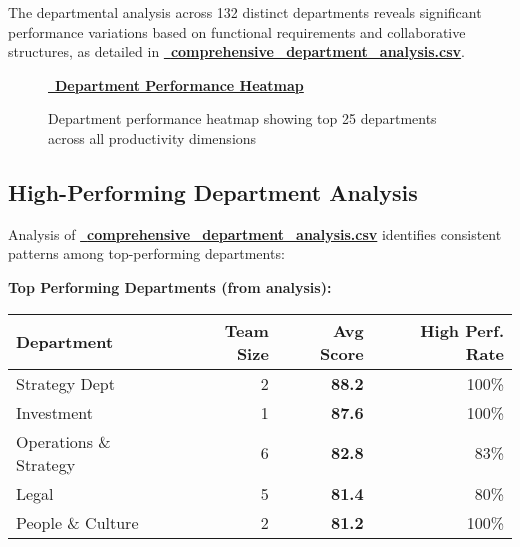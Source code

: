 \documentclass[12pt,a4paper]{article}
\newcommand{\styledimagelink}[2]{\textcolor{accentBlue}{\href{#1}{{\normalsize\faImage}\, \textbf{#2}}}}
\begin{document}
The departmental analysis across 132 distinct departments reveals significant performance variations based on functional requirements and collaborative structures, as detailed in \textcolor{primaryBlue}{\href{https://fixysaskihumorizijuv.supabase.co/storage/v1/object/public/research-files/c063886e-6e70-476c-b87d-de0dc3c0f2b9-comprehensive_department_analysis.csv?download=}{{\normalsize\faBuilding}\, \textbf{comprehensive\_department\_analysis.csv}}}.

\begin{figure}[H]
\centering
\styledimagelink{https://fixysaskihumorizijuv.supabase.co/storage/v1/object/public/research-files/5326cff0-f7c2-402c-a35b-242914f8596c-department_heatmap.png?download=}{Department Performance Heatmap}
\caption{Department performance heatmap showing top 25 departments across all productivity dimensions}
\label{fig:dept_heatmap}
\end{figure}

\subsection{High-Performing Department Analysis}

Analysis of \textcolor{primaryBlue}{\href{https://fixysaskihumorizijuv.supabase.co/storage/v1/object/public/research-files/c063886e-6e70-476c-b87d-de0dc3c0f2b9-comprehensive_department_analysis.csv?download=}{{\normalsize\faBuilding}\, \textbf{comprehensive\_department\_analysis.csv}}} identifies consistent patterns among top-performing departments:

\begin{statsbox}
\textbf{\faTrophy \quad Top Performing Departments (from analysis):}
\begin{center}
\begin{tabular}{@{}lrrr@{}}
\textbf{\color{primaryGold}Department} & \textbf{Team Size} & \textbf{Avg Score} & \textbf{High Perf. Rate} \\
\midrule
Strategy Dept & 2 & \textbf{88.2} & 100\% \\
Investment & 1 & \textbf{87.6} & 100\% \\
Operations \& Strategy & 6 & \textbf{82.8} & 83\% \\
Legal & 5 & \textbf{81.4} & 80\% \\
People \& Culture & 2 & \textbf{81.2} & 100\% \\
\end{tabular}
\end{center}
\end{statsbox}
\end{document}
